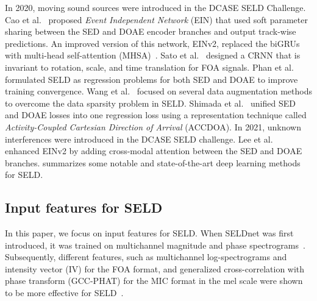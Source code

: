 \documentclass[journal]{IEEEtran}
\newcommand{\etalcite}[1]{ et al.~\cite{#1}}
\newcommand*{\gccphat}{\mbox{GCC-PHAT}\xspace}
\newcommand{\aname}[1]{\emph{#1}}
\begin{document}
In 2020, moving sound sources were introduced in the DCASE SELD Challenge. Cao\etalcite{Cao2020Event-independentDetection} proposed \aname{Event Independent Network} (EIN) that used soft parameter sharing between the SED and DOAE encoder branches and output track-wise predictions. An improved version of this network, EINv2, replaced the biGRUs with multi-head self-attention (MHSA)~\cite{Cao2021AnDetection}. Sato\etalcite{Sato2021AmbisonicEquivariance} designed a CRNN that is invariant to rotation, scale, and time translation for FOA signals. Phan\etalcite{Phan2020OnLocalization} formulated SELD as regression problems for both SED and DOAE to improve training convergence. 
Wang\etalcite{Wang2021ADetection} focused on several data augmentation methods to overcome the data sparsity problem in SELD. Shimada\etalcite{Shimada2021ACCDOA:Detection} unified SED and DOAE losses into one regression loss using a representation technique called \aname{Activity-Coupled Cartesian Direction of Arrival} (ACCDOA).
In 2021, unknown interferences were introduced in the DCASE SELD challenge. Lee\etalcite{Lee2021SoundChallenge} enhanced EINv2 by adding cross-modal attention between the SED and DOAE branches. 
 summarizes some notable and state-of-the-art deep learning methods for SELD.

\subsection{Input features for SELD}

In this paper, we focus on input features for SELD. When SELDnet was first introduced, it was trained on multichannel magnitude and phase spectrograms~\cite{Adavanne2019SoundNetworks}. Subsequently, different features, such as multichannel log-spectrograms and intensity vector (IV) for the FOA format, and generalized cross-correlation with phase transform (\gccphat) for the MIC format in the mel scale were shown to be more effective for SELD~\cite{Politis2020ADetection, Politis2021, Cao2019PolyphonicStrategy, Cao2021AnDetection, Shimada2021ACCDOA:Detection, Wang2021ADetection, Wang2020TheChallenge, Shimada2021EnsembleDetection}. 
\end{document}
